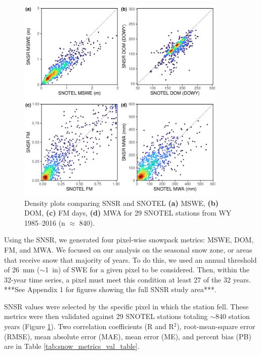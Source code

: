 \begin{figure}[t]
\centering
\includegraphics[width=10cm]{figures/ch2_figs/snsr_snotel_metric_compare_new_v1.pdf}
\caption{Density plots comparing SNSR and SNOTEL \textbf{(a)} MSWE, \textbf{(b)} DOM, \textbf{(c)} FM days, \textbf{(d)} MWA for 29 SNOTEL stations from WY 1985--2016 (n $\approx$ 840).}
\label{kuy_study_area}
\end{figure}

Using the SNSR, we generated four pixel-wise snowpack metrics: MSWE, DOM, FM, and MWA. We focused on our analysis on the seasonal snow zone, or areas that receive snow that majority of years. To do this, we used an annual threshold of 26~mm ($\sim$1~in) of SWE for a given pixel to be considered. Then, within the 32-year time series, a pixel must meet this condition at least 27 of the 32 years. ***See Appendix 1 for figures showing the full SNSR study area***. 

SNSR values were selected by the specific pixel in which the station fell. These metrics were then validated against 29 SNOTEL stations totaling $\sim$840 station years (Figure \ref{kuy_study_area}). Two correlation coefficients (R and R$^{2}$), root-mean-square error (RMSE), mean absolute error (MAE), mean error (ME), and percent bias (PB) are in Table \ref{tab:snow_metrics_val_table}.

